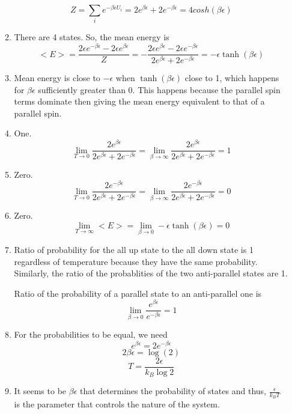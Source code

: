 \documentclass[letterpaper,12pt]{article}
\begin{document}
\begin{enumerate}
\begin{enumerate}
\[Z = \sum_i e^{-\beta \epsilon U_i} = 2 e^{\beta \epsilon}+ 2 e^{-\beta \epsilon} = 4 cosh(\beta \epsilon)\]
 \item
 There are 4 states. So, the mean energy is
 \[<E>= \frac{2\epsilon e^{-\beta \epsilon} -2\epsilon e^{ \beta \epsilon} }{Z}= -\frac{2\epsilon e^{\beta \epsilon} -2\epsilon e^{- \beta \epsilon} }{2 e^{\beta \epsilon}+ 2 e^{-\beta \epsilon}} = - \epsilon \tanh(\beta \epsilon) \]
 \item Mean energy is close to $-\epsilon$ when $\tanh(\beta \epsilon)$ close to 1, which happens for $\beta \epsilon$ sufficiently greater than 0. This happens because the parallel spin terms dominate then giving the mean energy equivalent to that of a parallel spin.
 \item One.
 \[\lim_{T \to 0} \frac{2 e^{\beta \epsilon}}{2 e^{\beta \epsilon}+2 e^{-\beta \epsilon}} = \lim_{\beta  \to \infty} \frac{2 e^{\beta \epsilon}}{2 e^{\beta \epsilon}+2 e^{-\beta \epsilon}} = 1 \]
 \item Zero.
  \[\lim_{T \to 0} \frac{2 e^{-\beta \epsilon}}{2 e^{\beta \epsilon}+2 e^{-\beta \epsilon}} = \lim_{\beta  \to \infty} \frac{2 e^{-\beta \epsilon}}{2 e^{\beta \epsilon}+2 e^{-\beta \epsilon}} = 0 \]
 \item Zero.
 \[\lim_{T \to \infty} <E> = \lim_{\beta  \to 0}  - \epsilon \tanh(\beta \epsilon) =0\]

 \item

Ratio of probability for the all up state to the all down state is 1 regardless of temperature because they have the same probability. Similarly, the ratio of the probablities of the two anti-parallel states are 1.



Ratio of the probability of a parallel state to an anti-parallel one is
 \[ \lim_{\beta  \to 0}\frac{ e^{\beta \epsilon}}{ e^{-\beta \epsilon}} = 1\]

 \item
 For the probabilities to be equal, we need
 \[e^{\beta \epsilon} = 2e^{-\beta \epsilon}\]
  \[2\beta \epsilon = \log(2)\]
	\[T = \frac{2 \epsilon}{k_B \log 2}\]

 \item

 It seems to be $\beta \epsilon$ that determines the probability of states and thus, $\frac{\epsilon}{k_B T}$ is the parameter that controls the nature of the system.

\end{enumerate}



\end{enumerate}
\end{document}

